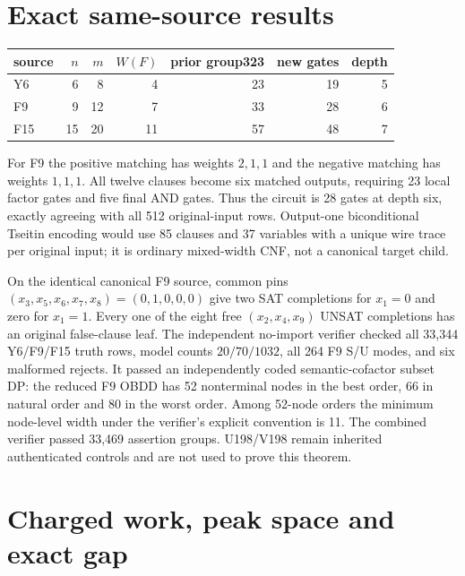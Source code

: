 \documentclass[11pt]{article}
\begin{document}
\section{Exact same-source results}

\begin{center}
\begin{tabular}{lrrrrrr}
\toprule
source & $n$ & $m$ & $W(F)$ & prior group323 & new gates & depth\\
\midrule
Y6  & 6  & 8  & 4  & 23 & 19 & 5\\
F9  & 9  & 12 & 7  & 33 & 28 & 6\\
F15 & 15 & 20 & 11 & 57 & 48 & 7\\
\bottomrule
\end{tabular}
\end{center}

For F9 the positive matching has weights $2,1,1$ and the negative matching has weights
$1,1,1$.  All twelve clauses become six matched outputs, requiring 23 local factor gates and
five final AND gates.  Thus the circuit is 28 gates at depth six, exactly agreeing with all
512 original-input rows.  Output-one biconditional Tseitin encoding would use 85 clauses and
37 variables with a unique wire trace per original input; it is ordinary mixed-width CNF,
not a canonical target child.

On the identical canonical F9 source, common pins
$(x_3,x_5,x_6,x_7,x_8)=(0,1,0,0,0)$ give two SAT completions for $x_1=0$ and zero for
$x_1=1$.  Every one of the eight free $(x_2,x_4,x_9)$ UNSAT completions has an original
false-clause leaf.  The independent no-import verifier checked all 33,344 Y6/F9/F15 truth
rows, model counts $20/70/1032$, all 264 F9 S/U modes, and six malformed rejects.  It passed
an independently coded semantic-cofactor subset DP: the reduced F9 OBDD has 52 nonterminal
nodes in the best order, 66 in natural order and 80 in the worst order.  Among 52-node
orders the minimum node-level width under the verifier's explicit convention is 11.
The combined verifier passed 33,469 assertion groups.  U198/V198 remain inherited
authenticated controls and are not used
to prove this theorem.

\section{Charged work, peak space and exact gap}
\end{document}
